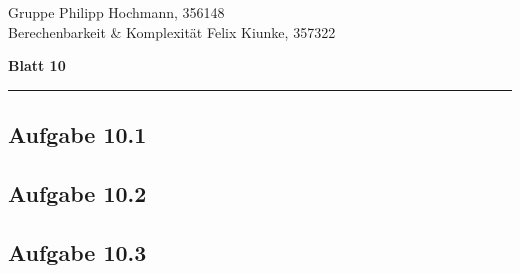 \documentclass[a4paper,graphics,11pt]{article}
\newcommand\aufgabe[1]{\subsection*{Aufgabe #1}}
\begin{document}
\noindent Gruppe              \hfill Philipp Hochmann, 356148 \\
\noindent Berechenbarkeit \& Komplexität \hfill Felix Kiunke, 357322 \\

\begin{center}
	\LARGE{\textbf{Blatt 10}}
\end{center}
\begin{center}
\rule[0.1ex]{\textwidth}{1pt}
\end{center}

\aufgabe{10.1}

\aufgabe{10.2}

\aufgabe{10.3}

\end{document}
